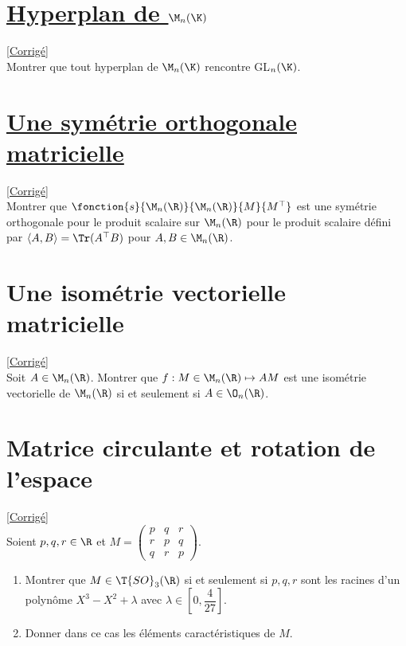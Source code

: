 \documentclass[8pt]{book}
\begin{document}
\section{\underline{Hyperplan de $\M_n(\K)$} }
\label{Hyperplan de Mn(K)}
\textcolor{blue}{\hyperref[Hyperplan de Mn(K) corrigé]{[Corrigé]}}\\
Montrer que tout hyperplan de $\M_n(\K)$ rencontre GL$_n(\K)$.

\section{\underline{Une symétrie orthogonale matricielle} }
\label{Une symétrie orthogonale matricielle}
\textcolor{blue}{\hyperref[Une symétrie orthogonale matricielle corrigé]{[Corrigé]}}\\
Montrer que $\fonction{s}{\M_n(\R)}{\M_n(\R)}{M}{M^\top}$ est une symétrie orthogonale pour le produit scalaire sur $\M_n(\R)$ pour le produit scalaire défini par $\langle A,B\rangle=\Tr(A^\top B)$ pour $A,B\in\M_n(\R)$.

\section{Une isométrie vectorielle matricielle}
\label{Une isométrie vectorielle matricielle}
\textcolor{blue}{\hyperref[Une isométrie vectorielle matricielle corrigé]{[Corrigé]}}\\
Soit $A\in \M_n(\R)$. Montrer que $f:M\in \M_n(\R)\mapsto AM$ est une isométrie vectorielle de $\M_n(\R)$ si et seulement si $A\in \O_n(\R)$.

\section{Matrice circulante et rotation de l'espace}
\label{Matrice circulante et rotation de l'espace}
\textcolor{blue}{\hyperref[Matrice circulante et rotation de l'espace corrigé]{[Corrigé]}}\\
Soient $p,q,r\in \R$ et $M=\begin{pmatrix}
	p&q&r\\
	r&p&q\\
	q&r&p
\end{pmatrix}$.
\begin{enumerate}
	\item Montrer que $M\in \T{SO}_3(\R)$ si et seulement si $p,q,r$ sont les racines d'un polynôme $X^3-X^2+\lambda$ avec $\lambda\in \left[0,\dfrac{4}{27}\right]$.
	\item Donner dans ce cas les éléments caractéristiques de $M$.
\end{enumerate}
\end{document}
